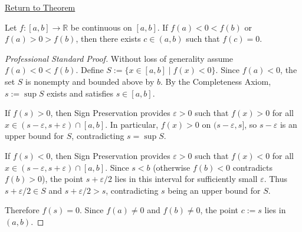 \newpage
{}
\label{prf:location-of-roots}

\begin{remark*}[Return]
\hyperref[thm:location-of-roots]{Return to Theorem}
\end{remark*}

\begin{theorem*}
Let $f : [a,b] \to \mathbb{R}$ be continuous on $[a,b]$. If $f(a) < 0 < f(b)$ or $f(a) > 0 > f(b)$, then there exists $c \in (a,b)$ such that $f(c) = 0$.
\end{theorem*}

\begin{proof}[Professional Standard Proof]
\LRAProofBodyStart
Without loss of generality assume $f(a) < 0 < f(b)$. Define $S := \{ x \in [a,b] \mid f(x) < 0 \}$. Since $f(a) < 0$, the set $S$ is nonempty and bounded above by $b$. By the Completeness Axiom, $s := \sup S$ exists and satisfies $s \in [a,b]$.

If $f(s) > 0$, then Sign Preservation provides $\varepsilon > 0$ such that $f(x) > 0$ for all $x \in (s - \varepsilon, s + \varepsilon) \cap [a,b]$. In particular, $f(x) > 0$ on $(s - \varepsilon, s]$, so $s - \varepsilon$ is an upper bound for $S$, contradicting $s = \sup S$.

If $f(s) < 0$, then Sign Preservation provides $\varepsilon > 0$ such that $f(x) < 0$ for all $x \in (s - \varepsilon, s + \varepsilon) \cap [a,b]$. Since $s < b$ (otherwise $f(b) < 0$ contradicts $f(b) > 0$), the point $s + \varepsilon/2$ lies in this interval for sufficiently small $\varepsilon$. Thus $s + \varepsilon/2 \in S$ and $s + \varepsilon/2 > s$, contradicting $s$ being an upper bound for $S$.

Therefore $f(s) = 0$. Since $f(a) \neq 0$ and $f(b) \neq 0$, the point $c := s$ lies in $(a,b)$.
\end{proof}

